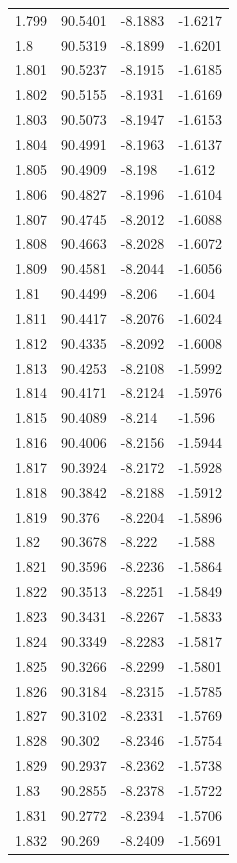 \begin{tabular}{llll}
1.799 & 90.5401 & -8.1883 & -1.6217 \\
1.8 & 90.5319 & -8.1899 & -1.6201 \\
1.801 & 90.5237 & -8.1915 & -1.6185 \\
1.802 & 90.5155 & -8.1931 & -1.6169 \\
1.803 & 90.5073 & -8.1947 & -1.6153 \\
1.804 & 90.4991 & -8.1963 & -1.6137 \\
1.805 & 90.4909 & -8.198 & -1.612 \\
1.806 & 90.4827 & -8.1996 & -1.6104 \\
1.807 & 90.4745 & -8.2012 & -1.6088 \\
1.808 & 90.4663 & -8.2028 & -1.6072 \\
1.809 & 90.4581 & -8.2044 & -1.6056 \\
1.81 & 90.4499 & -8.206 & -1.604 \\
1.811 & 90.4417 & -8.2076 & -1.6024 \\
1.812 & 90.4335 & -8.2092 & -1.6008 \\
1.813 & 90.4253 & -8.2108 & -1.5992 \\
1.814 & 90.4171 & -8.2124 & -1.5976 \\
1.815 & 90.4089 & -8.214 & -1.596 \\
1.816 & 90.4006 & -8.2156 & -1.5944 \\
1.817 & 90.3924 & -8.2172 & -1.5928 \\
1.818 & 90.3842 & -8.2188 & -1.5912 \\
1.819 & 90.376 & -8.2204 & -1.5896 \\
1.82 & 90.3678 & -8.222 & -1.588 \\
1.821 & 90.3596 & -8.2236 & -1.5864 \\
1.822 & 90.3513 & -8.2251 & -1.5849 \\
1.823 & 90.3431 & -8.2267 & -1.5833 \\
1.824 & 90.3349 & -8.2283 & -1.5817 \\
1.825 & 90.3266 & -8.2299 & -1.5801 \\
1.826 & 90.3184 & -8.2315 & -1.5785 \\
1.827 & 90.3102 & -8.2331 & -1.5769 \\
1.828 & 90.302 & -8.2346 & -1.5754 \\
1.829 & 90.2937 & -8.2362 & -1.5738 \\
1.83 & 90.2855 & -8.2378 & -1.5722 \\
1.831 & 90.2772 & -8.2394 & -1.5706 \\
1.832 & 90.269 & -8.2409 & -1.5691 \\

\end{tabular}
